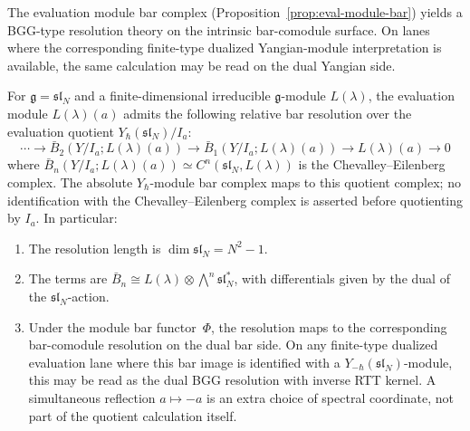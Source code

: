 The evaluation module bar complex
\textup{(}Proposition~\ref{prop:eval-module-bar}\textup{)} yields a
BGG-type resolution theory on the intrinsic bar-comodule surface. On
lanes where the corresponding finite-type dualized Yangian-module
interpretation is available, the same calculation may be read on the
dual Yangian side.

\begin{theorem}
\label{thm:yangian-bgg}
For $\mathfrak{g} = \mathfrak{sl}_N$ and a finite-dimensional
irreducible $\mathfrak{g}$-module $L(\lambda)$, the evaluation
module $L(\lambda)(a)$ admits the following relative bar resolution
over the evaluation quotient \(Y_\hbar(\mathfrak{sl}_N)/I_a\):
\begin{equation}\label{eq:yangian-bgg}
\cdots \to \bar{B}_2(Y/I_a; L(\lambda)(a))
 \to \bar{B}_1(Y/I_a; L(\lambda)(a))
 \to L(\lambda)(a) \to 0
\end{equation}
where $\bar{B}_n(Y/I_a; L(\lambda)(a))
\simeq C^n(\mathfrak{sl}_N, L(\lambda))$
is the Chevalley--Eilenberg complex. The absolute
\(Y_\hbar\)-module bar complex maps to this quotient complex; no
identification with the Chevalley--Eilenberg complex is asserted
before quotienting by \(I_a\). In particular:
\begin{enumerate}[label=\textup{(\roman*)}]
\item The resolution length is $\dim \mathfrak{sl}_N
 = N^2 - 1$.
\item The terms are
 $\bar{B}_n \cong L(\lambda) \otimes
 \bigwedge^n \mathfrak{sl}_N^*$,
 with differentials given by the dual of the
 $\mathfrak{sl}_N$-action.
\item Under the module bar functor~$\Phi$, the resolution maps to the
 corresponding bar-comodule resolution on the dual bar side. On any
 finite-type dualized evaluation lane where this bar image is
 identified with a \(Y_{-\hbar}(\mathfrak{sl}_N)\)-module, this may
 be read as the dual BGG resolution with inverse RTT kernel. A
 simultaneous reflection \(a\mapsto -a\) is an extra choice of
 spectral coordinate, not part of the quotient calculation itself.
\end{enumerate}
\end{theorem}

